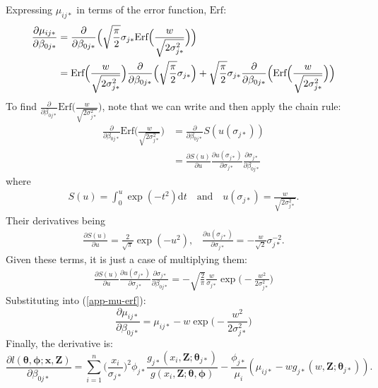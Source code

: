 \documentclass[10pt]{article}
\begin{document}
Expressing $\mu_{ij*}$ in terms of the error function, $\text{Erf}$:
\begin{align}
\frac{\partial \mu_{ij*}}{\partial \beta_{0j*}} &= \frac{\partial}{\partial \beta_{0j*}} \Big( \sqrt{\frac{\pi}{2}} \sigma_{j*} \text{Erf}\Big(\frac{w}{\sqrt{2\sigma_{j*}^2}}\Big) \Big) \notag \\
&= \text{Erf}\Big(\frac{w}{\sqrt{2\sigma_{j*}^2}}\Big) \frac{\partial}{\partial \beta_{0j*}} \Big( \sqrt{\frac{\pi}{2}} \sigma_{j*} \Big) + \sqrt{\frac{\pi}{2}} \sigma_{j*} \frac{\partial}{\partial \beta_{0j*}} \Big(\text{Erf}\Big(\frac{w}{\sqrt{2\sigma_{j*}^2}}\Big) \Big)\label{app-mu-erf}
\end{align}
To find $\frac{\partial}{\partial \beta_{0j*}} \text{Erf}\Big(\frac{w}{\sqrt{2\sigma_{j*}^2}}\Big)$, note that we can write and then apply the chain rule:
\begin{align*}
\frac{\partial}{\partial \beta_{0j*}} \text{Erf}\Big(\frac{w}{\sqrt{2\sigma_{j*}^2}}\Big) &= \frac{\partial}{\partial \beta_{0j*}} S(u(\sigma_{j*}))\\
&= \frac{\partial S(u)}{\partial u} \frac{\partial u(\sigma_{j*})}{\partial \sigma_{j*} } \frac{\partial \sigma_{j*}}{\partial \beta_{0j*}}
\end{align*}
where 
\begin{align*}
S(u) = \int_0^{u} \exp(-t^2) \text{d}t \quad \text{and} \quad u(\sigma_{j*})=\frac{w}{\sqrt{2\sigma_{j*}^2}}.
\end{align*}
Their derivatives being
\begin{align*}
\frac{\partial S(u)}{\partial u} = \frac{2}{\sqrt{\pi}} \exp(-u^2) \text{,} \quad \frac{\partial u(\sigma_{j*})}{\partial \sigma_{j*}} = -\frac{w}{\sqrt{2}}\sigma_{j*}^{-2}.
\end{align*}
Given these terms, it is just a case of multiplying them:
\begin{align*}
\frac{\partial S(u)}{\partial u} \frac{\partial u(\sigma_{j*})}{\partial \sigma_{j*} } \frac{\partial \sigma_{j*}}{\partial \beta_{0j*}} = - \sqrt{\frac{2}{\pi}} \frac{w}{\sigma_{j*}} \exp\Big( -\frac{w^2}{2\sigma_{j*}^2} \Big)
\end{align*}
Substituting into (\ref{app-mu-erf}):
\begin{equation*}
\frac{\partial \mu_{ij*}}{\partial \beta_{0j*}} =  \mu_{ij*} - w \exp\Big( -\frac{w^2}{2\sigma_{j*}^2} \Big)
\end{equation*}
Finally, the derivative is:
\begin{equation*}
\frac{\partial l(\boldsymbol{\theta}, \boldsymbol{\phi}; \mathbf{x},\mathbf{Z})}{\partial \beta_{0j*}} = \sum_{i=1}^n \Big( \frac{x_i}{\sigma_{j*}}\Big)^2 \phi_{j*} \frac{g_{j*}(x_i,\mathbf{Z}; \boldsymbol{\theta}_{j*})}{g(x_i,\mathbf{Z}; \boldsymbol{\theta},\boldsymbol{\phi})}  - \frac{\phi_{j*}}{\mu_i} (\mu_{ij*} - w g_{j*}(w,\mathbf{Z}; \boldsymbol{\theta}_{j*})).
\end{equation*}
\end{document}
